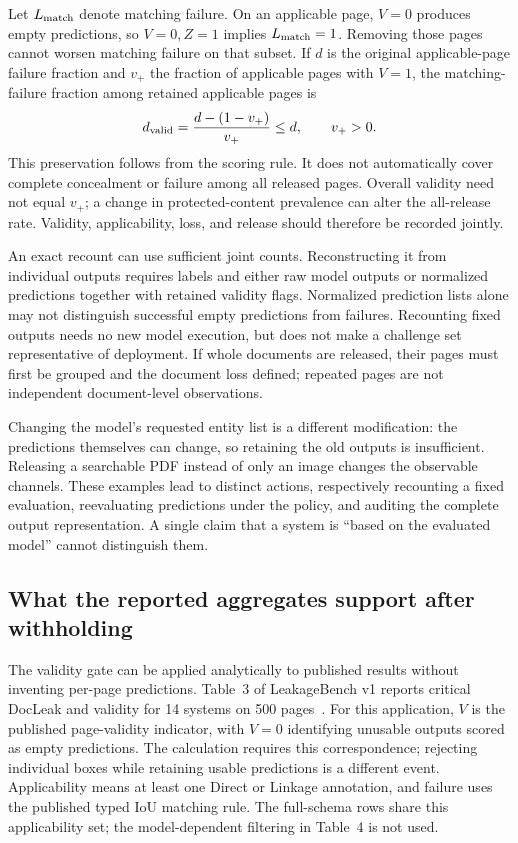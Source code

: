 \documentclass[conference]{IEEEtran}
\begin{document}
Let $L_{\rm match}$ denote matching failure. On an applicable page, $V=0$ produces empty predictions, so $V=0,Z=1$ implies $L_{\rm match}=1$. Removing those pages cannot worsen matching failure on that subset. If $d$ is the original applicable-page failure fraction and $v_+$ the fraction of applicable pages with $V=1$, the matching-failure fraction among retained applicable pages is
\begin{equation}
 d_{\rm valid}=\frac{d-(1-v_+)}{v_+}\leq d,\qquad v_+>0.
\end{equation}
This preservation follows from the scoring rule. It does not automatically cover complete concealment or failure among all released pages. Overall validity need not equal $v_+$; a change in protected-content prevalence can alter the all-release rate. Validity, applicability, loss, and release should therefore be recorded jointly.

An exact recount can use sufficient joint counts. Reconstructing it from individual outputs requires labels and either raw model outputs or normalized predictions together with retained validity flags. Normalized prediction lists alone may not distinguish successful empty predictions from failures. Recounting fixed outputs needs no new model execution, but does not make a challenge set representative of deployment. If whole documents are released, their pages must first be grouped and the document loss defined; repeated pages are not independent document-level observations.

Changing the model's requested entity list is a different modification: the predictions themselves can change, so retaining the old outputs is insufficient. Releasing a searchable PDF instead of only an image changes the observable channels. These examples lead to distinct actions, respectively recounting a fixed evaluation, reevaluating predictions under the policy, and auditing the complete output representation. A single claim that a system is ``based on the evaluated model'' cannot distinguish them.

\subsection{What the reported aggregates support after withholding}
\label{sec:publicapplication}
The validity gate can be applied analytically to published results without inventing per-page predictions. Table~3 of LeakageBench v1 reports critical DocLeak and validity for 14 systems on 500 pages~\cite[Sec.~6, Table~3]{leakagebench2026}. For this application, $V$ is the published page-validity indicator, with $V=0$ identifying unusable outputs scored as empty predictions. The calculation requires this correspondence; rejecting individual boxes while retaining usable predictions is a different event. Applicability means at least one Direct or Linkage annotation, and failure uses the published typed IoU matching rule. The full-schema rows share this applicability set; the model-dependent filtering in Table~4 is not used.
\end{document}
